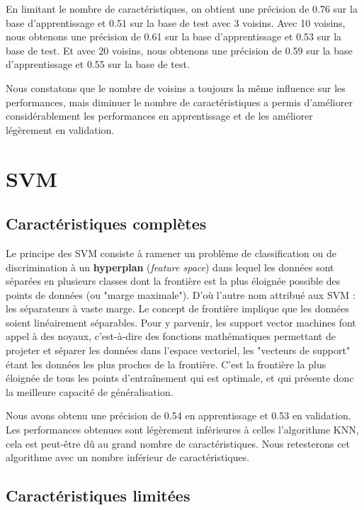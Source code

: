 En limitant le nombre de caractéristiques, on obtient une précision de 0.76 sur la base d'apprentissage et 0.51 sur la base de test avec 3 voisins.
Avec 10 voisins, nous obtenons une précision de 0.61 sur la base d'apprentissage et 0.53 sur la base de test. Et avec 20 voisins, nous obtenons une
précision de 0.59 sur la base d'apprentissage et 0.55 sur la base de test.

Nous constatons que le nombre de voisins a toujours la même influence sur les performances, mais diminuer le nombre de caractéristiques a permis d'améliorer
considérablement les performances en apprentissage et de les améliorer légèrement en validation.

\section{SVM}
\label{sec:svm}

\subsection*{Caractéristiques complètes}
\label{par:dataset-complet-svm}

Le principe des SVM consiste à ramener un problème de classification ou de discrimination à un \textbf{hyperplan} (\textit{feature space})
dans lequel les données sont séparées en plusieurs classes dont la frontière est la plus éloignée possible des points de
données (ou "marge maximale"). D'où l'autre nom attribué aux SVM : les séparateurs à vaste marge. Le concept de frontière
implique que les données soient linéairement séparables. Pour y parvenir, les support vector machines font appel à des noyaux,
c'est-à-dire des fonctions mathématiques permettant de projeter et séparer les données dans l'espace vectoriel, les "vecteurs
de support" étant les données les plus proches de la frontière. C'est la frontière la plus éloignée de tous les points d'entraînement
qui est optimale, et qui présente donc la meilleure capacité de généralisation.

Nous avons obtenu une précision de 0.54 en apprentissage et 0.53 en validation. Les performances obtenues sont légèrement inférieures à
celles l'algorithme KNN, cela est peut-être dû au grand nombre de caractéristiques. Nous retesterons cet algorithme avec un nombre inférieur
de caractéristiques.

\subsection*{Caractéristiques limitées}
\label{par:dataset-limit-svm}

